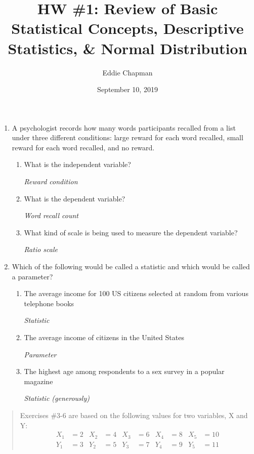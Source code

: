 \documentclass[]{article}
\title{HW \#1: Review of Basic Statistical Concepts, Descriptive Statistics, \&
Normal Distribution}
\author{Eddie Chapman}
\date{September 10, 2019}
\providecommand{\tightlist}{%
  \setlength{\itemsep}{0pt}\setlength{\parskip}{0pt}}
\begin{document}
\maketitle

\begin{enumerate}
\def\labelenumi{\arabic{enumi}.}
\tightlist
\item
  A psychologist records how many words participants recalled from a
  list under three different conditions: large reward for each word
  recalled, small reward for each word recalled, and no reward.

  \begin{enumerate}
  \def\labelenumii{\alph{enumii}.}
  \item
    What is the independent variable?

    \emph{Reward condition}
  \item
    What is the dependent variable?

    \emph{Word recall count}
  \item
    What kind of scale is being used to measure the dependent variable?

    \emph{Ratio scale}
  \end{enumerate}
\item
  Which of the following would be called a statistic and which would be
  called a parameter?

  \begin{enumerate}
  \def\labelenumii{\alph{enumii}.}
  \item
    The average income for 100 US citizens selected at random from
    various telephone books

    \emph{Statistic}
  \item
    The average income of citizens in the United States

    \emph{Parameter}
  \item
    The highest age among respondents to a sex survey in a popular
    magazine

    \emph{Statistic (generously)}
  \end{enumerate}
\end{enumerate}

\begin{quote}
Exercises \#3-6 are based on the following values for two variables, X
and Y: \[\begin{align*}
X_{1}&=2 & X_{2}&=4 & X_{3}&=6 & X_{4}&=8 & X_{5}&=10 \\
Y_{1}&=3 & Y_{2}&=5 & Y_{3}&=7 & Y_{4}&=9 & Y_{5}&=11
\end{align*}\]
\end{quote}
\end{document}
